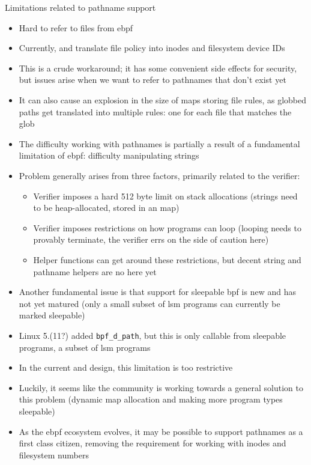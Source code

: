 \begin{inprogress}
  Limitations related to pathname support
  \begin{itemize}
    \item Hard to refer to files from \gls{ebpf}
    \item Currently, \bpfbox{} and \bpfcontain{} translate file policy into inodes and filesystem device IDs
    \item This is a crude workaround; it has some convenient side effects for security,
    but issues arise when we want to refer to pathnames that don't exist yet
    \item It can also cause an explosion in the size of maps storing file rules, as
    globbed paths get translated into multiple rules: one for each file that matches the
    glob

    \item The difficulty working with pathnames is partially a result of a fundamental limitation of \gls{ebpf}: difficulty manipulating strings
    \item Problem generally arises from three factors, primarily related to the verifier:
    \begin{itemize}
      \item Verifier imposes a hard 512 byte limit on stack allocations (strings need to be heap-allocated, stored in an map)
      \item Verifier imposes restrictions on how programs can loop (looping needs to provably terminate, the verifier errs on the side of caution here)
      \item Helper functions can get around these restrictions, but decent string and pathname helpers are no here yet
    \end{itemize}
    \item Another fundamental issue is that support for sleepable \gls{bpf} is new and has
    not yet matured (only a small subset of \gls{lsm} programs can currently be marked
    sleepable)
    \item Linux 5.(11?) added \texttt{bpf\_d\_path}, but this is only callable from sleepable programs, a subset of \gls{lsm} programs
    \item In the current \bpfbox{} and \bpfcontain{} design, this limitation is too restrictive
    \item Luckily, it seems like the community is working towards a general solution to
    this problem (dynamic map allocation and making more program types sleepable)
    \item As the \gls{ebpf} ecosystem evolves, it may be possible to support pathnames as
    a first class citizen, removing the requirement for working with inodes and filesystem
    numbers
  \end{itemize}


\end{inprogress}
